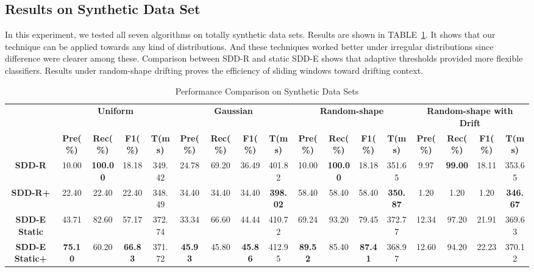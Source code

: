 \documentclass[10pt,conference,letterpaper]{article}
\begin{document}
		\subsection{Results on Synthetic Data Set}
			In this experiment, we tested all seven algorithms on totally synthetic data sets. Results are shown in TABLE~\ref{tab:performance-synthetic}. It shows that our technique can be applied towards any kind of distributions. And these techniques worked better under irregular distributions since difference were clearer among these. Comparison between SDD-R and static SDD-E 
			shows that adaptive thresholds provided more flexible classifiers. Results under random-shape drifting proves the efficiency of sliding windows toward drifting context.
		
			\begin{table}
				\centering
				\caption{Performance Comparison on Synthetic Data Sets}
				\label{tab:performance-synthetic}
				\footnotesize
				\begin{tabular}{|c|c|c|c|c|c|c|c|c|c|c|c|c|c|c|c|c|}
					\hline
					\multirow{2}{*}{\textbf{}} & \multicolumn{4}{c|}{\textbf{Uniform}} & \multicolumn{4}{c|}{\textbf{Gaussian}} & \multicolumn{4}{c|}{\textbf{Random-shape}} & \multicolumn{4}{c|}{\textbf{Random-shape with Drift}} \\ \cline{2-17} 
					& \textbf{Pre(\%)} & \textbf{Rec(\%)} & \textbf{F1(\%)} & \textbf{T(ms)} & \textbf{Pre(\%)} & \textbf{Rec(\%)} & \textbf{F1(\%)} & \textbf{T(ms)} & \textbf{Pre(\%)} & \textbf{Rec(\%)} & \textbf{F1(\%)} & \textbf{T(ms)} & \textbf{Pre(\%)} & \textbf{Rec(\%)} & \textbf{F1(\%)} & \textbf{T(ms)} \\ \hline
					\textbf{SDD-R} & 10.00 & \textbf{100.00} & 18.18 & 349.42 & 24.78 & 69.20 & 36.49 & 401.82 & 10.00 & \textbf{100.00} & 18.18 & 351.65 & 9.97 & \textbf{99.00} & 18.11 & 353.65 \\ \hline
					\textbf{SDD-R+} & 22.40 & 22.40 & 22.40 & 348.49 & 34.40 & 34.40 & 34.40 & \textbf{398.02} & 58.40 & 58.40 & 58.40 & \textbf{350.87} & 1.20 & 1.20 & 1.20 & \textbf{346.67} \\ \hline
					\textbf{SDD-E Static} & 43.71 & 82.60 & 57.17 & 372.74 & 33.34 & 66.60 & 44.44 & 410.72 & 69.24 & 93.20 & 79.45 & 372.77 & 12.34 & 97.20 & 21.91 & 369.63 \\ \hline
					\textbf{SDD-E Static+} & \textbf{75.10} & 60.20 & \textbf{66.83} & 371.72 & \textbf{45.93} & 45.80 & \textbf{45.86} & 412.95 & \textbf{89.52} & 85.40 & \textbf{87.41} & 368.97 & 12.60 & 94.20 & 22.23 & 370.12 \\ \hline

\end{tabular}
\end{table}
\end{document}
